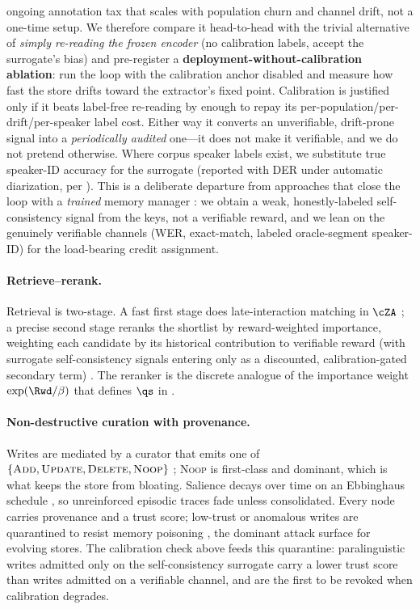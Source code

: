 ongoing annotation tax that scales with population churn and channel drift, not a one-time setup. We therefore compare it head-to-head with the trivial alternative of \emph{simply re-reading the frozen encoder} (no calibration labels, accept the surrogate's bias) and pre-register a \textbf{deployment-without-calibration ablation}: run the loop with the calibration anchor disabled and measure how fast the store drifts toward the extractor's fixed point. Calibration is justified only if it beats label-free re-reading by enough to repay its per-population/per-drift/per-speaker label cost. Either way it converts an unverifiable, drift-prone signal into a \emph{periodically audited} one---it does not make it verifiable, and we do not pretend otherwise. Where corpus speaker labels exist, we substitute true speaker-ID accuracy for the surrogate (reported with DER under automatic diarization, per ). This is a deliberate departure from approaches that close the loop with a \emph{trained} memory manager \citep{memoryr1_2025}: we obtain a weak, honestly-labeled self-consistency signal from the keys, not a verifiable reward, and we lean on the genuinely verifiable channels (WER, exact-match, labeled oracle-segment speaker-ID) for the load-bearing credit assignment.

\paragraph{Retrieve--rerank.} Retrieval is two-stage. A fast first stage does late-interaction matching in $\cZA$ \citep{colbert2020}; a precise second stage reranks the shortlist by reward-weighted importance, weighting each candidate by its historical contribution to verifiable reward (with surrogate self-consistency signals entering only as a discounted, calibration-gated secondary term) \citep{genagents2023}. The reranker is the discrete analogue of the importance weight $\exp(\Rwd/\beta)$ that defines $\qs$ in .

\paragraph{Non-destructive curation with provenance.} Writes are mediated by a curator that emits one of $\{\textsc{Add}, \textsc{Update}, \textsc{Delete}, \textsc{Noop}\}$ \citep{mem0_2025}; \textsc{Noop} is first-class and dominant, which is what keeps the store from bloating. Salience decays over time on an Ebbinghaus schedule \citep{memorybank2023}, so unreinforced episodic traces fade unless consolidated. Every node carries provenance and a trust score; low-trust or anomalous writes are quarantined to resist memory poisoning \citep{agentpoison2024}, the dominant attack surface for evolving stores. The calibration check above feeds this quarantine: paralinguistic writes admitted only on the self-consistency surrogate carry a lower trust score than writes admitted on a verifiable channel, and are the first to be revoked when calibration degrades.

